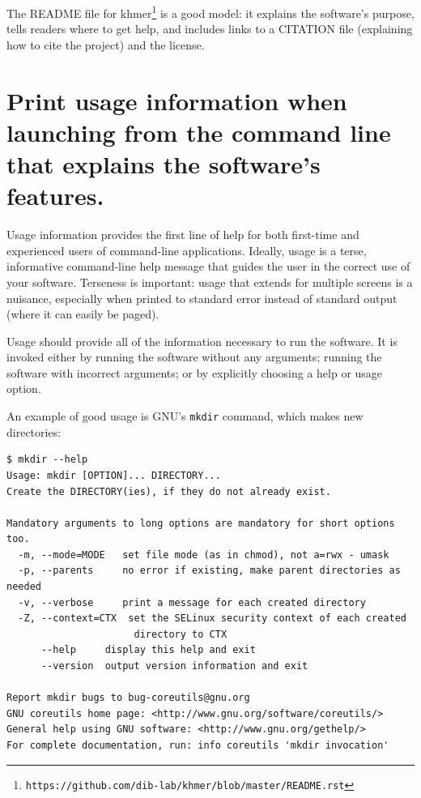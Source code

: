 \documentclass[10pt,letterpaper]{article}
\newcommand{\withurl}[2]{{#1}\footnote{\texttt{#2}}}
\begin{document}
The README file for \withurl{khmer}{https://github.com/dib-lab/khmer/blob/master/README.rst}
is a good model:
it explains the software's purpose,
tells readers where to get help,
and includes links to a CITATION file (explaining how to cite the project)
and the license.

\section{Print usage information when launching from the command line that explains the software's features.}

Usage information provides the first line of help for both first-time and
experienced users of command-line applications.
Ideally, usage is a terse, informative command-line help message that
guides the user in the correct use of your software. Terseness is
important: usage that extends for multiple screens is a nuisance, especially when
printed to standard error instead of standard output (where it can
easily be paged).

Usage should provide all of the information necessary to run the
software. It is invoked either by running the software without
any arguments; running the software with incorrect arguments; or by
explicitly choosing a help or usage option.

An example of good usage is GNU's \texttt{mkdir} command, which makes
new directories:

\begin{small}
\begin{verbatim}
$ mkdir --help
Usage: mkdir [OPTION]... DIRECTORY...
Create the DIRECTORY(ies), if they do not already exist.

Mandatory arguments to long options are mandatory for short options too.
  -m, --mode=MODE   set file mode (as in chmod), not a=rwx - umask
  -p, --parents     no error if existing, make parent directories as needed
  -v, --verbose     print a message for each created directory
  -Z, --context=CTX  set the SELinux security context of each created
                      directory to CTX
      --help     display this help and exit
      --version  output version information and exit

Report mkdir bugs to bug-coreutils@gnu.org
GNU coreutils home page: <http://www.gnu.org/software/coreutils/>
General help using GNU software: <http://www.gnu.org/gethelp/>
For complete documentation, run: info coreutils 'mkdir invocation'
\end{verbatim}
\end{small}
\end{document}
